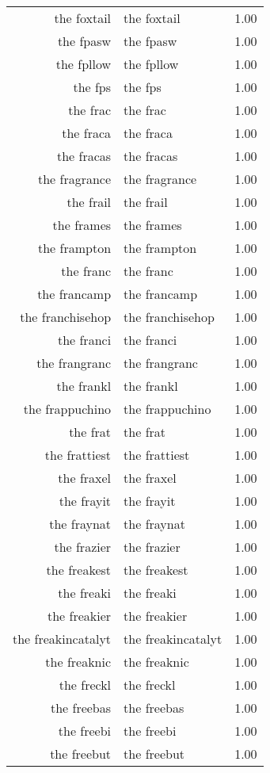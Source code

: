 \begin{table}[ht]
\begin{tabular}{rlr}
  the foxtail & the foxtail & 1.00 \\ 
  the fpasw & the fpasw & 1.00 \\ 
  the fpllow & the fpllow & 1.00 \\ 
  the fps & the fps & 1.00 \\ 
  the frac & the frac & 1.00 \\ 
  the fraca & the fraca & 1.00 \\ 
  the fracas & the fracas & 1.00 \\ 
  the fragrance & the fragrance & 1.00 \\ 
  the frail & the frail & 1.00 \\ 
  the frames & the frames & 1.00 \\ 
  the frampton & the frampton & 1.00 \\ 
  the franc & the franc & 1.00 \\ 
  the francamp & the francamp & 1.00 \\ 
  the franchisehop & the franchisehop & 1.00 \\ 
  the franci & the franci & 1.00 \\ 
  the frangranc & the frangranc & 1.00 \\ 
  the frankl & the frankl & 1.00 \\ 
  the frappuchino & the frappuchino & 1.00 \\ 
  the frat & the frat & 1.00 \\ 
  the frattiest & the frattiest & 1.00 \\ 
  the fraxel & the fraxel & 1.00 \\ 
  the frayit & the frayit & 1.00 \\ 
  the fraynat & the fraynat & 1.00 \\ 
  the frazier & the frazier & 1.00 \\ 
  the freakest & the freakest & 1.00 \\ 
  the freaki & the freaki & 1.00 \\ 
  the freakier & the freakier & 1.00 \\ 
  the freakincatalyt & the freakincatalyt & 1.00 \\ 
  the freaknic & the freaknic & 1.00 \\ 
  the freckl & the freckl & 1.00 \\ 
  the freebas & the freebas & 1.00 \\ 
  the freebi & the freebi & 1.00 \\ 
  the freebut & the freebut & 1.00 \\ 

\end{tabular}
\end{table}
